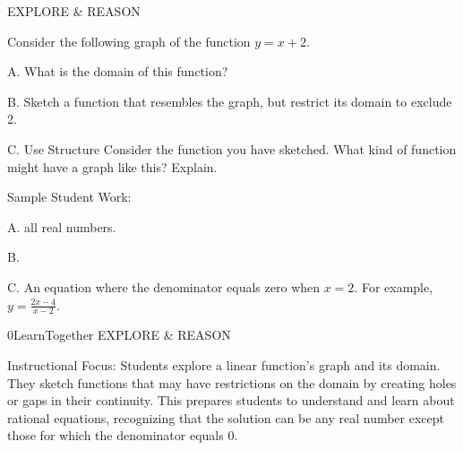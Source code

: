 \documentclass{article}
\newenvironment{model-discuss}{}{}      %
\newenvironment{te-addendum}[2]{}{}     %
\begin{document}
\begin{model-discuss}
EXPLORE \& REASON

Consider the following graph of the function \(y=x+2\).


A. What is the domain of this function?

B. Sketch a function that resembles the graph, but restrict its domain to exclude 2.

C. Use Structure Consider the function you have sketched. What kind of function might have a graph like this? Explain.

Sample Student Work:

A. all real numbers.

B.

C. An equation where the denominator equals zero when \(x=2\). For example, \(y=\frac{2x-4}{x-2}\).
\end{model-discuss}

\begin{te-addendum}{0}{LearnTogether}
EXPLORE \& REASON

Instructional Focus: Students explore a linear function's graph and its domain. They sketch functions that may have restrictions on the domain by creating holes or gaps in their continuity. This prepares students to understand and learn about rational equations, recognizing that the solution can be any real number except those for which the denominator equals 0.
\end{te-addendum}
\end{document}
